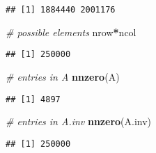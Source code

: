 \documentclass[]{article}
\newenvironment{Shaded}{\begin{snugshade}}{\end{snugshade}}
\newcommand{\CommentTok}[1]{\textcolor[rgb]{0.56,0.35,0.01}{\textit{#1}}}
\newcommand{\KeywordTok}[1]{\textcolor[rgb]{0.13,0.29,0.53}{\textbf{#1}}}
\newcommand{\NormalTok}[1]{#1}
\newcommand{\OperatorTok}[1]{\textcolor[rgb]{0.81,0.36,0.00}{\textbf{#1}}}
\begin{document}
\begin{verbatim}
## [1] 1884440 2001176
\end{verbatim}

\begin{Shaded}
\begin{Highlighting}[]
\CommentTok{# possible elements}
\NormalTok{nrow}\OperatorTok{*}\NormalTok{ncol}
\end{Highlighting}
\end{Shaded}

\begin{verbatim}
## [1] 250000
\end{verbatim}

\begin{Shaded}
\begin{Highlighting}[]
\CommentTok{# entries in A}
\KeywordTok{nnzero}\NormalTok{(A)}
\end{Highlighting}
\end{Shaded}

\begin{verbatim}
## [1] 4897
\end{verbatim}

\begin{Shaded}
\begin{Highlighting}[]
\CommentTok{# entries in A.inv}
\KeywordTok{nnzero}\NormalTok{(A.inv)}
\end{Highlighting}
\end{Shaded}

\begin{verbatim}
## [1] 250000
\end{verbatim}
\end{document}

